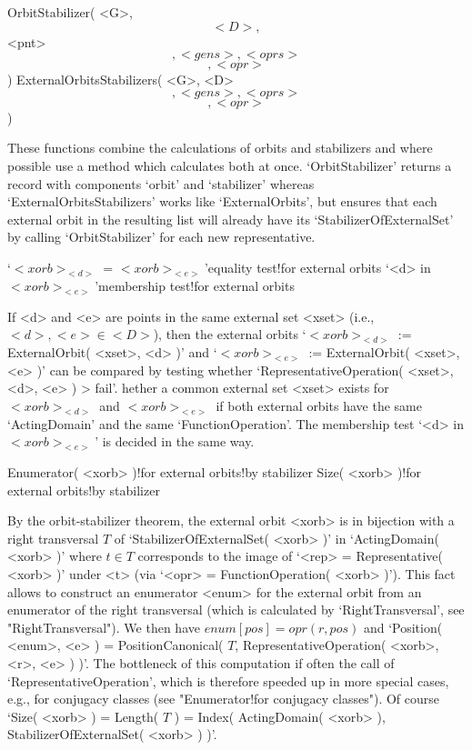\>OrbitStabilizer( <G>, \[ <D>, \] <pnt> \[, <gens>, <oprs> \] %
                   \[, <opr> \] )
\>ExternalOrbitsStabilizers( <G>, <D> \[, <gens>, <oprs> \] %
                             \[, <opr> \] )
%

These functions combine  the calculations of  orbits and stabilizers  and
where   possible  use    a method which       calculates both  at   once.
`OrbitStabilizer' returns    a  record  with  components   `orbit'    and
`stabilizer'    whereas   `ExternalOrbitsStabilizers'       works    like
`ExternalOrbits',  but ensures that each external  orbit in the resulting
list  will already   have   its   `StabilizerOfExternalSet' by    calling
`OrbitStabilizer' for each new representative.

\>`$<xorb>_{<d>}$ = $<xorb>_{<e>}$'{equality test}!{for external orbits}
\>`<d> in $<xorb>_{<e>}$'{membership test}!{for external orbits}

If  <d> and   <e>  are points   in  the same  external  set <xset> (i.e.,
$<d>,<e>\in   <D>$),  then    the  external    orbits `$<xorb>_{<d>}$  :=
ExternalOrbit(  <xset>,  <d>  )'  and  `$<xorb>_{<e>}$  := ExternalOrbit(
<xset>,   <e>     )'  can       be   compared   by    testing     whether
`RepresentativeOperation( <xset>,  <d>, <e> ) \<>  fail'. hether a common
external set <xset> exists for $<xorb>_{<d>}$  and $<xorb>_{<e>}$ if both
external    orbits   have the   same      `ActingDomain'  and  the   same
`FunctionOperation'.   The  membership test  `<d>   in $<xorb>_{<e>}$' is
decided in the same way.

\>Enumerator( <xorb> )!{for external orbits!by stabilizer}
\>Size( <xorb> )!{for external orbits!by stabilizer}

By the   orbit-stabilizer  theorem,  the  external   orbit <xorb>  is  in
bijection  with  a   right transversal  $T$  of `StabilizerOfExternalSet(
<xorb> )'  in `ActingDomain( <xorb> )' where  $t\in T$ corresponds to the
image of  `<rep> = Representative(  <xorb>   )' under <t> (via  `<opr>  =
FunctionOperation(  <xorb> )'). This fact  allows {\GAP}  to construct an
enumerator <enum> for the external orbit  from an enumerator of the right
transversal     (which    is  calculated     by  `RightTransversal',  see
"RightTransversal"). We then  have  $enum[ pos ]  =  opr( r,  pos )$  and
`Position(    <enum>,     <e>      )    =    PositionCanonical(      $T$,
RepresentativeOperation( <xorb>,  <r>, <e> )  )'.  The bottleneck of this
computation if often  the  call  of `RepresentativeOperation',  which  is
therefore  speeded up in more  special cases, e.g., for conjugacy classes
(see  "Enumerator!for conjugacy  classes").  Of course `Size(  <xorb> ) =
Length( $T$ )  = Index( ActingDomain( <xorb>  ), StabilizerOfExternalSet(
<xorb> ) )'.

